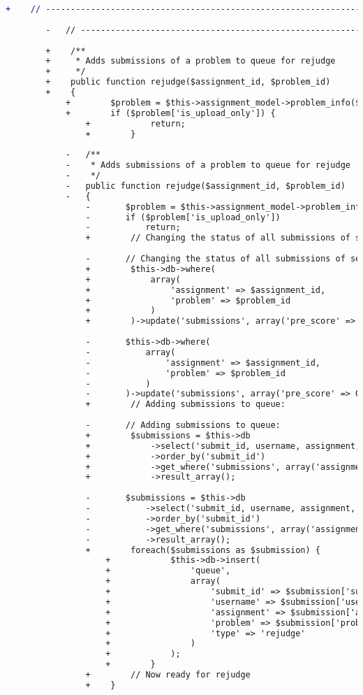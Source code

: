 \begin{lstlisting}[language=diff, caption=Perubahan pada kode Queue\_model.php]
		+    // ------------------------------------------------------------------------
		
		-	// ------------------------------------------------------------------------
		
		+    /**
		+     * Adds submissions of a problem to queue for rejudge
		+     */
		+    public function rejudge($assignment_id, $problem_id)
		+    {
			+        $problem = $this->assignment_model->problem_info($assignment_id, $problem_id);
			+        if ($problem['is_upload_only']) {
				+            return;
				+        }
			
			-	/**
			-	 * Adds submissions of a problem to queue for rejudge
			-	 */
			-	public function rejudge($assignment_id, $problem_id)
			-	{
				-		$problem = $this->assignment_model->problem_info($assignment_id, $problem_id);
				-		if ($problem['is_upload_only'])
				-			return;
				+        // Changing the status of all submissions of selected problem to PENDING
				
				-		// Changing the status of all submissions of selected problem to PENDING
				+        $this->db->where(
				+            array(
				+                'assignment' => $assignment_id,
				+                'problem' => $problem_id
				+            )
				+        )->update('submissions', array('pre_score' => 0, 'status' => 'PENDING'));
				
				-		$this->db->where(
				-			array(
				-				'assignment' => $assignment_id,
				-				'problem' => $problem_id
				-			)
				-		)->update('submissions', array('pre_score' => 0, 'status' => 'PENDING'));
				+        // Adding submissions to queue:
				
				-		// Adding submissions to queue:
				+        $submissions = $this->db
				+            ->select('submit_id, username, assignment, problem')
				+            ->order_by('submit_id')
				+            ->get_where('submissions', array('assignment' => $assignment_id, 'problem' => $problem_id))
				+            ->result_array();
				
				-		$submissions = $this->db
				-			->select('submit_id, username, assignment, problem')
				-			->order_by('submit_id')
				-			->get_where('submissions', array('assignment'=>$assignment_id, 'problem'=>$problem_id))
				-			->result_array();
				+        foreach($submissions as $submission) {
					+            $this->db->insert(
					+                'queue',
					+                array(
					+                    'submit_id' => $submission['submit_id'],
					+                    'username' => $submission['username'],
					+                    'assignment' => $submission['assignment'],
					+                    'problem' => $submission['problem'],
					+                    'type' => 'rejudge'
					+                )
					+            );
					+        }
				+        // Now ready for rejudge
				+    }
			

\end{lstlisting}
